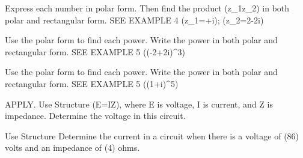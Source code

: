 \documentclass{article}
\newenvironment{practice}[2]{}{}        %
\newcommand{\answer}[1]{}               %
\newcommand{\placeholder}[2]{}          %
\begin{document}
\begin{practice}{36}{1}
Express each number in polar form. Then find the product (z_1z_2) in both polar and rectangular form. SEE EXAMPLE 4
(z_1=+i); (z_2=2-2i)
\answer{(z_1=2\operatorname{cis}\frac\pi6); (z_2=4\operatorname{cis}\frac{5\pi}3); (z_1z_2=8\operatorname{cis}\frac{11\pi}6); (4\sqrt3-4i)}
\end{practice}
\begin{practice}{37}{1}
Use the polar form to find each power. Write the power in both polar and rectangular form. SEE EXAMPLE 5
((-2+2i)^3)
\answer{(16\sqrt2\operatorname{cis}\frac{9\pi}4); (16+16i)}
\end{practice}
\begin{practice}{38}{1}
Use the polar form to find each power. Write the power in both polar and rectangular form. SEE EXAMPLE 5
((1+i)^5)
\answer{(32\operatorname{cis}\frac{5\pi}3); (16-16\sqrt3i)}
\end{practice}
\begin{practice}{39}{2}
APPLY. Use Structure (E=I\cdot Z), where E is voltage, I is current, and Z is impedance. Determine the voltage in this circuit.
\placeholder{diagram}{Black rectangular circuit on light-blue background, AC source circle on left with sine-wave symbol, plus above and minus below, zigzag resistor right. White callouts I=2 cis(pi/3) amps above left, Z=3 cis(11pi/6) ohms above right.}
\answer{(6\operatorname{cis}\frac{13\pi}6=3\sqrt3+3i) volts}
\end{practice}
\begin{practice}{40}{2}
Use Structure Determine the current in a circuit when there is a voltage of (8\frac{7\pi}6) volts and an impedance of (4\frac{}) ohms.
\answer{(2\operatorname{cis}\frac{5\pi}6=-\sqrt3+i) amps}
\end{practice}
\end{document}
